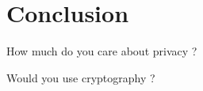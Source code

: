 \documentclass[compress]{beamer}
\newcommand{\R}{\mathbb{R}}
\newcommand{\C}{\mathbb{C}}
\theoremstyle{definition}
\theoremstyle{definition}
\theoremstyle{definition}
\theoremstyle{remark}
\theoremstyle{remark}
\theoremstyle{definition}
\theoremstyle{definition}
\theoremstyle{definition}
\theoremstyle{definition}
\theoremstyle{definition}
\theoremstyle{remark}
\theoremstyle{remark}
\theoremstyle{remark}
\theoremstyle{remark}
\begin{document}
%			
%					
				
		
		\nocite{*}
	         
	         \section*{Conclusion}
				\begin{frame}
					\huge{How much do you care about privacy ?}
					
					 Would you use cryptography ?
				\end{frame}
	
\end{document}
